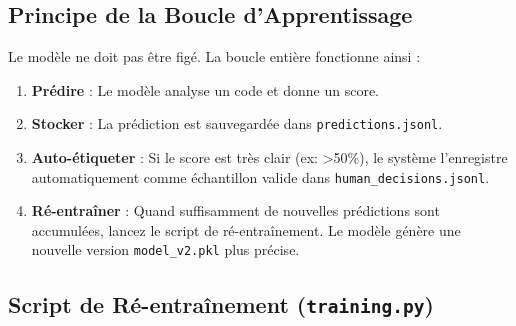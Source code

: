 \documentclass[a4paper,11pt]{article}
\begin{document}
\subsection{Principe de la Boucle d'Apprentissage}
Le modèle ne doit pas être figé. La boucle entière fonctionne ainsi :

\begin{enumerate}
    \item \textbf{Prédire} : Le modèle analyse un code et donne un score.
    \item \textbf{Stocker} : La prédiction est sauvegardée dans \texttt{predictions.jsonl}.
    \item \textbf{Auto-étiqueter} : Si le score est très clair (ex: \textgreater 50\%), le système l'enregistre automatiquement comme échantillon valide dans \texttt{human\_decisions.jsonl}.
    \item \textbf{Ré-entraîner} : Quand suffisamment de nouvelles prédictions sont accumulées, lancez le script de ré-entraînement. Le modèle génère une nouvelle version \texttt{model\_v2.pkl} plus précise.
\end{enumerate}

\subsection{Script de Ré-entraînement (\texttt{training.py})}
\end{document}
